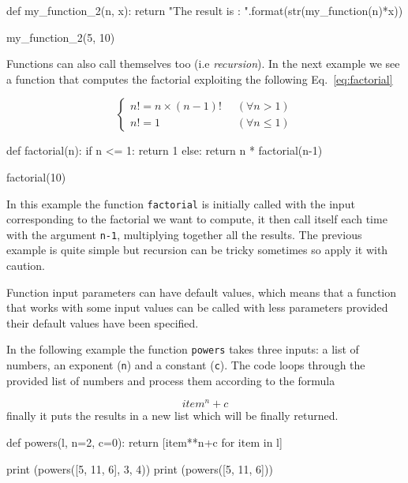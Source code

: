 \begin{ipython}
def my_function_2(n, x):
    return "The result is : {}".format(str(my_function(n)*x))

my_function_2(5, 10)
\end{ipython}

Functions can also call themselves too (i.e \emph{recursion}). In the next example we see a function that computes the factorial exploiting the following Eq.~\ref{eq:factorial}

\begin{equation}
\begin{cases}
    n! = n \times (n-1)! & \;\; (\forall n \gt 1) \\
    n! = 1 & \;\; (\forall n \le 1)
\end{cases}
\label{eq:factorial}
\end{equation}

\begin{ipython}
def factorial(n):
    if n <= 1:
        return 1
    else:
        return n * factorial(n-1)

factorial(10)
\end{ipython}

In this example the function \texttt{factorial} is initially called with the input corresponding to the factorial we want to compute, it then call itself each time with the argument \texttt{n-1}, 
multiplying together all the results. The previous example is quite simple but recursion can be tricky sometimes so apply it with caution. 

Function input parameters can have default values, which means that a function that works with some input values can be called with less parameters provided their default values have been specified.

In the following example the function \texttt{powers} takes three inputs: a list of numbers, an exponent (\texttt{n}) and a constant (\texttt{c}). The code loops through the provided list of numbers and process them according to the formula 

\[
item^{n} + c
\]
finally it puts the results in a new list which will be finally returned.

\begin{ipython}
def powers(l, n=2, c=0):
    return [item**n+c for item in l]

print (powers([5, 11, 6], 3, 4))
print (powers([5, 11, 6]))
\end{ipython}
\begin{ioutput}
[129, 1335, 220]
[25, 121, 36]
\end{ioutput}
    
